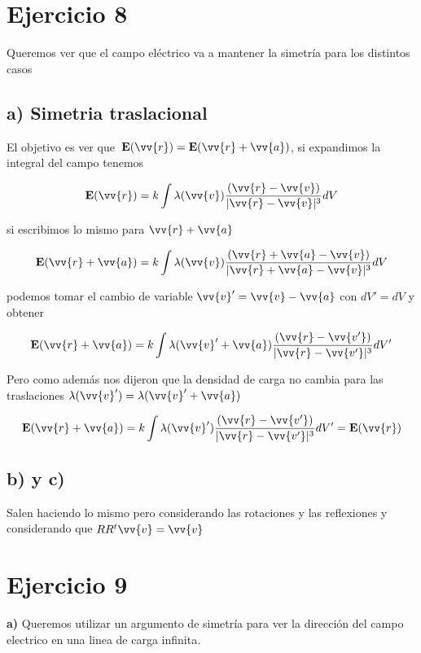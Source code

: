 \documentclass[leqno, 12pt, twoside, letterpaper]{book}
\def\efield{\textbf{E}}
\begin{document}
\section*{Ejercicio 8}

Queremos ver que el campo eléctrico va a mantener la simetría para los distintos casos

\subsection*{a) Simetria traslacional}

El objetivo es ver que  $\,\efield(\vv{r}) = \efield(\vv{r} + \vv{a})$, si expandimos la integral del campo tenemos

\[ \efield(\vv{r}) = k \int \lambda(\vv{v}) \dfrac{(\vv{r} - \vv{v})}{|\vv{r} - \vv{v}|^3} dV \]

\noindent si escribimos lo mismo para $\vv{r} + \vv{a}$ 


\[ \efield(\vv{r} + \vv{a}) = k \int \lambda(\vv{v}) \dfrac{(\vv{r} + \vv{a} - \vv{v})}{|\vv{r} + \vv{a} - \vv{v}|^3} dV \]

\noindent podemos tomar el cambio de variable $\vv{v}' = \vv{v} - \vv{a} $ con $dV' =  dV $ y obtener 


\[ \efield(\vv{r} + \vv{a}) = k \int \lambda(\vv{v}' + \vv{a}) \dfrac{(\vv{r} - \vv{v'})}{|\vv{r} - \vv{v'}|^3} dV' \]

\noindent Pero como además nos dijeron que la densidad de carga no cambia para las traslaciones $\lambda(\vv{v}') = \lambda(\vv{v}'+\vv{a})$

$$ \efield(\vv{r} + \vv{a}) = k \int \lambda(\vv{v}') \dfrac{(\vv{r} - \vv{v'})}{|\vv{r} - \vv{v'}|^3} dV' =  \efield(\vv{r})
$$

\subsection*{b) y c)} 

Salen haciendo lo mismo pero considerando las rotaciones y las reflexiones y considerando que $ R R^t \vv{v} = \vv{v}$

\section*{Ejercicio 9} 

\textbf{a)} Queremos utilizar un argumento de simetría para ver la dirección del campo electrico en una linea de carga infinita.
\end{document}

